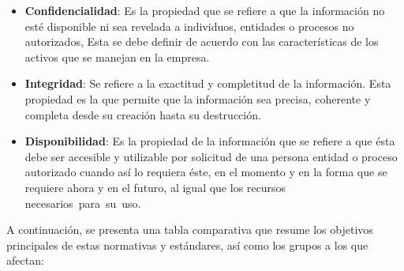 \documentclass[a4paper, 11pt]{article}
\begin{document}
\begin{itemize}
\item \textbf{Confidencialidad}: Es la propiedad que se refiere a que la información no esté disponible ni sea revelada a individuos, entidades o procesos no autorizados, Esta se debe definir de acuerdo con las características de los activos que se manejan en la empresa.
\item \textbf{Integridad}: Se refiere a la exactitud y completitud de la información. Esta propiedad es la que permite que la información sea precisa, coherente y completa desde su creación hasta su destrucción. 
\item \textbf{Disponibilidad}: Es la propiedad de la información que se refiere a que ésta debe ser accesible y utilizable por solicitud de una persona entidad o proceso autorizado cuando así lo requiera éste, en el momento y en la forma que se requiere ahora y en el futuro, al igual que los recursos necesarios para su uso.
\end{itemize}
\par\vspace{0.5cm}

A continuación, se presenta una tabla comparativa que resume los objetivos principales de estas normativas y estándares, así como los grupos a los que afectan:
\end{document}
